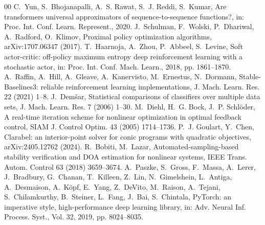 \documentclass[final,5p,times,twocolumn]{elsarticle}
\begin{document}
\begin{thebibliography}{00}
 C.~Yun, S.~Bhojanapalli, A.~S. Rawat, S.~J. Reddi, S.~Kumar, Are transformers universal approximators of sequence-to-sequence functions?, in: Proc. Int. Conf. Learn. Represent., 2020.
 J.~Schulman, F.~Wolski, P.~Dhariwal, A.~Radford, O.~Klimov, Proximal policy optimization algorithms, arXiv:1707.06347 (2017).
 T.~Haarnoja, A.~Zhou, P.~Abbeel, S.~Levine, Soft actor-critic: off-policy maximum entropy deep reinforcement learning with a stochastic actor, in: Proc. Int. Conf. Mach. Learn., 2018, pp. 1861--1870.
 A.~Raffin, A.~Hill, A.~Gleave, A.~Kanervisto, M.~Ernestus, N.~Dormann, Stable-Baselines3: reliable reinforcement learning implementations, J. Mach. Learn. Res. 22 (2021) 1--8.
 J.~Dem\v{s}ar, Statistical comparisons of classifiers over multiple data sets, J. Mach. Learn. Res. 7 (2006) 1--30.
 M.~Diehl, H.~G. Bock, J.~P. Schl\"oder, A real-time iteration scheme for nonlinear optimization in optimal feedback control, SIAM J. Control Optim. 43 (2005) 1714--1736.
 P.~J. Goulart, Y.~Chen, Clarabel: an interior-point solver for conic programs with quadratic objectives, arXiv:2405.12762 (2024).
 R.~Bobiti, M.~Lazar, Automated-sampling-based stability verification and DOA estimation for nonlinear systems, IEEE Trans. Autom. Control 63 (2018) 3659--3674.
 A.~Paszke, S.~Gross, F.~Massa, A.~Lerer, J.~Bradbury, G.~Chanan, T.~Killeen, Z.~Lin, N.~Gimelshein, L.~Antiga, A.~Desmaison, A.~K\"opf, E.~Yang, Z.~DeVito, M.~Raison, A.~Tejani, S.~Chilamkurthy, B.~Steiner, L.~Fang, J.~Bai, S.~Chintala, PyTorch: an imperative style, high-performance deep learning library, in: Adv. Neural Inf. Process. Syst., Vol. 32, 2019, pp. 8024--8035.
\end{thebibliography}
\end{document}
